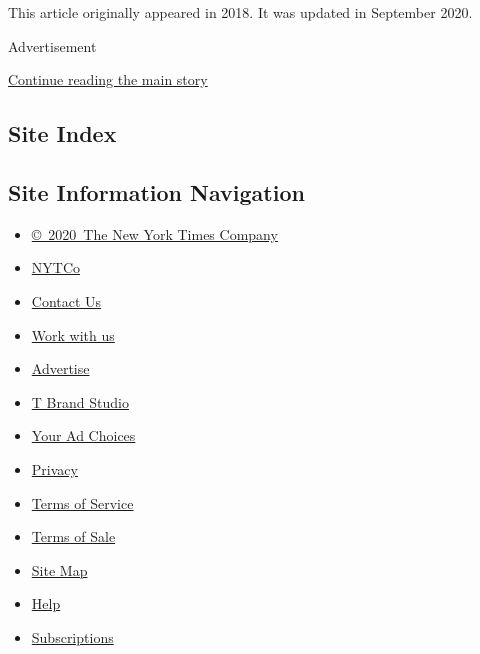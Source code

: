 This article originally appeared in 2018. It was updated in September
2020.

Advertisement

\protect\hyperlink{after-bottom}{Continue reading the main story}

\hypertarget{site-index}{%
\subsection{Site Index}\label{site-index}}

\hypertarget{site-information-navigation}{%
\subsection{Site Information
Navigation}\label{site-information-navigation}}

\begin{itemize}
\tightlist
\item
  \href{https://help.nytimes3xbfgragh.onion/hc/en-us/articles/115014792127-Copyright-notice}{©~2020~The
  New York Times Company}
\end{itemize}

\begin{itemize}
\tightlist
\item
  \href{https://www.nytco.com/}{NYTCo}
\item
  \href{https://help.nytimes3xbfgragh.onion/hc/en-us/articles/115015385887-Contact-Us}{Contact
  Us}
\item
  \href{https://www.nytco.com/careers/}{Work with us}
\item
  \href{https://nytmediakit.com/}{Advertise}
\item
  \href{http://www.tbrandstudio.com/}{T Brand Studio}
\item
  \href{https://www.nytimes3xbfgragh.onion/privacy/cookie-policy\#how-do-i-manage-trackers}{Your
  Ad Choices}
\item
  \href{https://www.nytimes3xbfgragh.onion/privacy}{Privacy}
\item
  \href{https://help.nytimes3xbfgragh.onion/hc/en-us/articles/115014893428-Terms-of-service}{Terms
  of Service}
\item
  \href{https://help.nytimes3xbfgragh.onion/hc/en-us/articles/115014893968-Terms-of-sale}{Terms
  of Sale}
\item
  \href{https://spiderbites.nytimes3xbfgragh.onion}{Site Map}
\item
  \href{https://help.nytimes3xbfgragh.onion/hc/en-us}{Help}
\item
  \href{https://www.nytimes3xbfgragh.onion/subscription?campaignId=37WXW}{Subscriptions}
\end{itemize}
